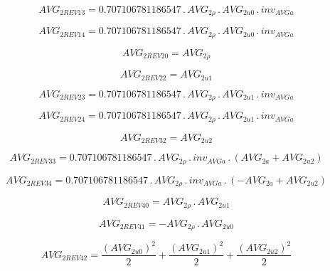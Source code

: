 \documentclass{article}
\begin{document}
\begin{dmath}AVG_{2 REV 13} = 0.707106781186547 \,.\, AVG_{2 \rho} \,.\, AVG_{2 u0} \,.\, inv_{AVG a}\end{dmath}

\begin{dmath}AVG_{2 REV 14} = 0.707106781186547 \,.\, AVG_{2 \rho} \,.\, AVG_{2 u0} \,.\, inv_{AVG a}\end{dmath}

\begin{dmath}AVG_{2 REV 20} = AVG_{2 \rho}\end{dmath}

\begin{dmath}AVG_{2 REV 22} = AVG_{2 u1}\end{dmath}

\begin{dmath}AVG_{2 REV 23} = 0.707106781186547 \,.\, AVG_{2 \rho} \,.\, AVG_{2 u1} \,.\, inv_{AVG a}\end{dmath}

\begin{dmath}AVG_{2 REV 24} = 0.707106781186547 \,.\, AVG_{2 \rho} \,.\, AVG_{2 u1} \,.\, inv_{AVG a}\end{dmath}

\begin{dmath}AVG_{2 REV 32} = AVG_{2 u2}\end{dmath}

\begin{dmath}AVG_{2 REV 33} = 0.707106781186547 \,.\, AVG_{2 \rho} \,.\, inv_{AVG a} \,.\, \left(AVG_{2 a} + AVG_{2 u2}\right)\end{dmath}

\begin{dmath}AVG_{2 REV 34} = 0.707106781186547 \,.\, AVG_{2 \rho} \,.\, inv_{AVG a} \,.\, \left(- AVG_{2 a} + AVG_{2 u2}\right)\end{dmath}

\begin{dmath}AVG_{2 REV 40} = AVG_{2 \rho} \,.\, AVG_{2 u1}\end{dmath}

\begin{dmath}AVG_{2 REV 41} = - AVG_{2 \rho} \,.\, AVG_{2 u0}\end{dmath}

\begin{dmath}AVG_{2 REV 42} = \frac{\left(AVG_{2 u0} \right)^{2}}{2} + \frac{\left(AVG_{2 u1} \right)^{2}}{2} + \frac{\left(AVG_{2 u2} \right)^{2}}{2}\end{dmath}
\end{document}
